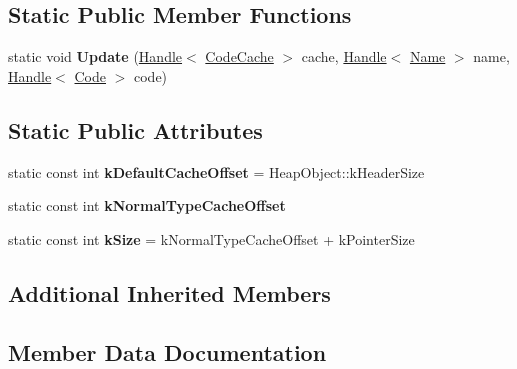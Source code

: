 \subsection*{Static Public Member Functions}
\begin{DoxyCompactItemize}
\item 
\hypertarget{classv8_1_1internal_1_1_code_cache_ab431ebb86c5163634be72919de32d0b2}{}static void {\bfseries Update} (\hyperlink{classv8_1_1internal_1_1_handle}{Handle}$<$ \hyperlink{classv8_1_1internal_1_1_code_cache}{Code\+Cache} $>$ cache, \hyperlink{classv8_1_1internal_1_1_handle}{Handle}$<$ \hyperlink{classv8_1_1internal_1_1_name}{Name} $>$ name, \hyperlink{classv8_1_1internal_1_1_handle}{Handle}$<$ \hyperlink{classv8_1_1internal_1_1_code}{Code} $>$ code)\label{classv8_1_1internal_1_1_code_cache_ab431ebb86c5163634be72919de32d0b2}

\end{DoxyCompactItemize}
\subsection*{Static Public Attributes}
\begin{DoxyCompactItemize}
\item 
\hypertarget{classv8_1_1internal_1_1_code_cache_a2d041e5a845b96160078bd54e14cc133}{}static const int {\bfseries k\+Default\+Cache\+Offset} = Heap\+Object\+::k\+Header\+Size\label{classv8_1_1internal_1_1_code_cache_a2d041e5a845b96160078bd54e14cc133}

\item 
static const int {\bfseries k\+Normal\+Type\+Cache\+Offset}
\item 
\hypertarget{classv8_1_1internal_1_1_code_cache_a2c42fa87808dacbb4e63f8c1e9222c28}{}static const int {\bfseries k\+Size} = k\+Normal\+Type\+Cache\+Offset + k\+Pointer\+Size\label{classv8_1_1internal_1_1_code_cache_a2c42fa87808dacbb4e63f8c1e9222c28}

\end{DoxyCompactItemize}
\subsection*{Additional Inherited Members}


\subsection{Member Data Documentation}
\hypertarget{classv8_1_1internal_1_1_code_cache_ad3de5d24f972e67003a07d1a0848d37c}{}
